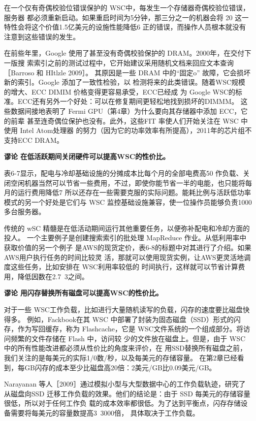 在一个仅有奇偶校验位错误保护的 WSC中，每发生一个存储器奇偶校验位错误，服务器
都必须重新启动。如果重启时间为5分钟，那三分之一的机器会将 20%
这一特性会将这个价值1.5亿美元的设施性能降低6%
正的错误，而操作人员根本就没有注意到这些错误的发生。

在前些年里，Google 使用了甚至没有奇偶校验保护的 DRAM。2000年，在交付下一版搜
索索引之前的测试过程中，它开始建议采用随机文档来回应文本查询［Barroso 和 HItlzle 2009］。
其原因是一些 DRAM 中的“固定o” 故障，它会损坏新的索引。Google 添加了一致性检验，以
检测将来的此类错误。随着WSC规模的增大、ECC DIMIM 价格变得更容易承受，ECC已经成
为 Google WSC的标准。ECC还有另外一个好处：可以在修复期间更轻松地找到损坏的DIMMM。
这些数据间接地表明了 Fermi GPU（第4章）为什么要向其存储器中添加 ECC，它的前辈
甚至连奇偶位保护也没有。此外，这些FIT 率使人们开始关注在 WSC 中使用 Intel Atom处理器
的努力（因为它的功率效率有所提高），2011年的芯片组不支持ECC DRAM。

\textbf{谬论 在低活跃期间关闭硬件可以提高WSC的性价比。}

表6-7显示，配电与冷却基础设施的分摊成本比每个月的全部电费高50%
作负载、关闭空闲机器当然可以节省一些费用，不过，即使你能节省一半的电能，也只能将每
月的运行费用降低7%
所以还存在一些需要克服的实际问题。能耗比例与活跃低功率模式的另一个好处是它们与 WSC
监控基础设施兼容，使一位操作员能够负责1000多台服务器。

传统的 wSC 精髓是在低活动期间运行其他重要任务，以便弥补配电和冷却方面的投人。
一个主要例子是创建搜索索引的批处理 MapReduce 作业。从低利用率中获取价值的另一个例子
是AWS的现货定价，表6-8的标题中对其进行了介绍。如果 AWS用户执行任务的时间比较灵
活，那就可以使用现货实例，让AWS更灵活地调度这些任务，比如安排在 WSC利用率较低的
时间执行，这样就可以节省计算费用，降低因数在2.7~3之间。

\textbf{谬论 用闪存替换所有磁盘可以提高WSC的性价比。}

对于一些 WSC工作负载，比如进行大量随机读写的负载，闪存的速度要比磁盘快得多。
例如，Fackbook在其 WSC 中部署了封装为固态磁盘（SSD）形式的闪存，作为写回缓存，称为
Flashcache，它是 WSC文件系统的一个组成部分。将访问频繁的文件存储在 Flash 中，访问较
少的文件放在磁盘上。但是，由于 WSC中的所有性能改进都必须从性价比的角度来评价，在
用SSD替换所有磁盘之前，我们关注的是每美元的实际1/0数/秒，以及每美元的存储容量。
在第2章已经看到，每GB闪存的成本至少比磁盘高20倍：2美元/GB比0.09美元/GB。

Narayanan 等人［2009］通过模拟小型与大型数据中心的工作负载轨迹，研究了从磁盘向SSD
迁移工作负载的效果。他们的结论是：由于 SSD 每美元的存储容量很低，所以对于任何工作负
载的成本效率都很低。为了达到平衡点，闪存存储设备需要将每美元的容量数提高3~3000倍，
具体取决于工作负载。

